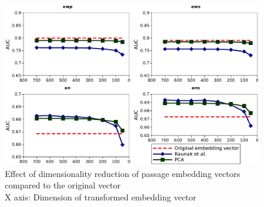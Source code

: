 \begin{figure}[h]
  \centering
  \includegraphics[width=0.9\linewidth]{graphics/emb_vec_dim_red_plot.eps}
  \caption{Effect of dimensionality reduction of passage embedding vectors compared to the original vector \\
  X axis: Dimension of transformed embedding vector}
  \label{fig:dimred}
\end{figure}